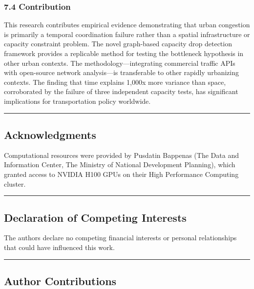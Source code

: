 \documentclass[
  12pt,
]{article}
\begin{document}
\subsubsection{7.4 Contribution}\label{contribution}

This research contributes empirical evidence demonstrating that urban congestion is primarily a temporal coordination failure rather than a spatial infrastructure or capacity constraint problem. The novel graph-based capacity drop detection framework provides a replicable method for testing the bottleneck hypothesis in other urban contexts. The methodology---integrating commercial traffic APIs with open-source network analysis---is transferable to other rapidly urbanizing contexts. The finding that time explains 1,000x more variance than space, corroborated by the failure of three independent capacity tests, has significant implications for transportation policy worldwide.

\begin{center}\rule{0.5\linewidth}{0.5pt}\end{center}

\subsection{Acknowledgments}\label{acknowledgments}

Computational resources were provided by Pusdatin Bappenas (The Data and Information Center, The Ministry of National Development Planning), which granted access to NVIDIA H100 GPUs on their High Performance Computing cluster.

\begin{center}\rule{0.5\linewidth}{0.5pt}\end{center}

\subsection{Declaration of Competing Interests}\label{declaration-of-competing-interests}

The authors declare no competing financial interests or personal relationships that could have influenced this work.

\begin{center}\rule{0.5\linewidth}{0.5pt}\end{center}

\subsection{Author Contributions}\label{author-contributions}
\end{document}
